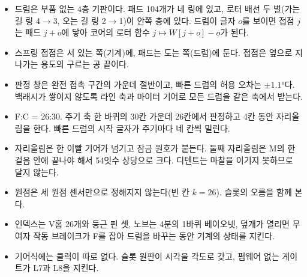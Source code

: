 \begin{itemize}
\item 드럼은 부품 없는 4층 기판이다. 패드 104개가 네 링에 있고, 로터 배선 두 벌(가는 길 링 4$\to$3, 오는 길 링 2$\to$1)이
안쪽 층에 있다. 드럼이 글자 $o$를 보이면 접점 $j$는 패드 $j+o$에 닿아 코어의 로터 함수 $j \mapsto W[j+o]-o$가 된다.
\item 스프링 접점은 서 있는 쪽(기계)에, 패드는 도는 쪽(드럼)에 둔다. 접점은 옆으로 지나가는 용도의 구르는 공 끝이다.
\item 판정 창은 완전 접촉 구간의 가운데 절반이고, 빠른 드럼의 허용 오차는 $\pm1.1°$다. 백래시가 쌓이지 않도록 라인
축과 마이터 기어로 모든 드럼을 같은 축에서 받는다.
\item F:C = 26:30. 주기 축 한 바퀴의 30칸 가운데 26칸에서 판정하고 4칸 동안 자리올림을 한다. 빠른 드럼의 시작 글자가
주기마다 네 칸씩 밀린다.
\item 자리올림은 한 이빨 기어가 넘기고 잠금 원호가 붙든다. 둘째 자리올림은 M의 한 걸음 안에 끝나야 해서 54잇수 상당으로
크다. 디텐트는 마찰을 이기지 못하므로 달지 않는다.
\item 원점은 세 원점 센서만으로 정해지지 않는다(빈 칸 $k = 26$).  슬롯의 오름을 함께 본다.
\item 인덱스는 V홈 26개와 둥근 핀 셋, 노브는 4분의 1바퀴 베이오넷, 덮개가 열리면 무여자 작동 브레이크가 F를 잡아 드럼을
바꾸는 동안 기계의 상태를 지킨다.
\item 기어식에는 클럭이 따로 없다. 슬롯 원판이 시각을 각도로 갖고, 펌웨어 없는 게이트가 L7과 L8을 지킨다.
\end{itemize}
